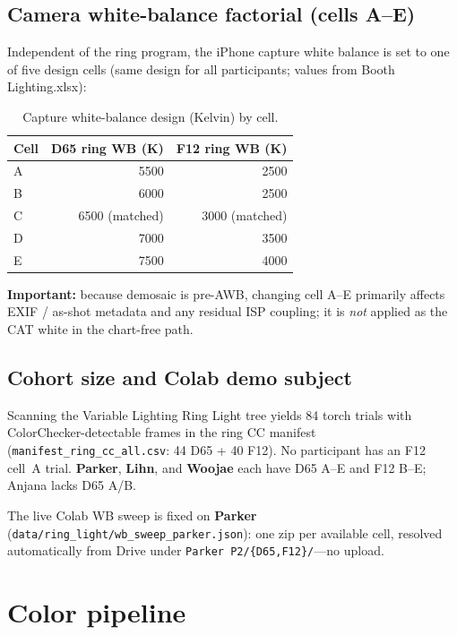 \documentclass[11pt]{article}
\begin{document}
\subsection{Camera white-balance factorial (cells A--E)}
Independent of the ring program, the iPhone capture white balance is set to one
of five design cells (same design for all participants; values from Booth
Lighting.xlsx):

\begin{table}[h]
\centering
\caption{Capture white-balance design (Kelvin) by cell.}
\label{tab:wb-design}
\begin{tabular}{lrr}
\toprule
Cell & D65 ring WB (K) & F12 ring WB (K) \\
\midrule
A & 5500 & 2500 \\
B & 6000 & 2500 \\
C & 6500 (matched) & 3000 (matched) \\
D & 7000 & 3500 \\
E & 7500 & 4000 \\
\bottomrule
\end{tabular}
\end{table}

\textbf{Important:} because demosaic is pre-AWB, changing cell A--E primarily
affects EXIF / as-shot metadata and any residual ISP coupling; it is \emph{not}
applied as the CAT white in the chart-free path.

\subsection{Cohort size and Colab demo subject}
Scanning the Variable Lighting Ring Light tree yields 84 torch trials with
ColorChecker-detectable frames in the ring CC manifest
(\texttt{manifest\_ring\_cc\_all.csv}: 44 D65 + 40 F12).
No participant has an F12 cell~A trial.
\textbf{Parker}, \textbf{Lihn}, and \textbf{Woojae} each have D65 A--E and F12 B--E;
Anjana lacks D65 A/B.

The live Colab WB sweep is fixed on \textbf{Parker}
(\texttt{data/ring\_light/wb\_sweep\_parker.json}): one zip per available cell,
resolved automatically from Drive under \texttt{Parker P2/\{D65,F12\}/}---no upload.

\FloatBarrier

\section{Color pipeline}
\end{document}

